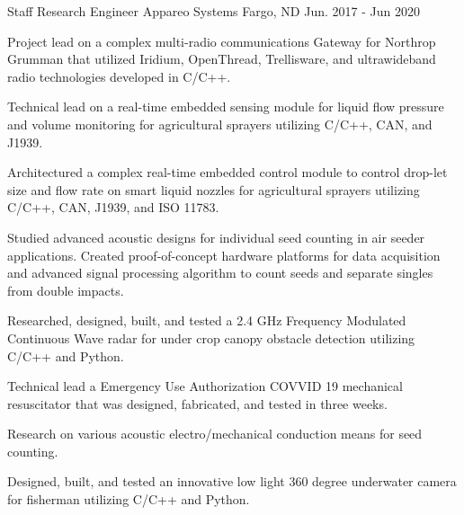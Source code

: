 \begin{cventries}
  \cventry
    {Staff Research Engineer} %
    {Appareo Systems} %
    {Fargo, ND} %
    {Jun. 2017 - Jun 2020} %
    {
      \begin{cvitems} %
        \item {Project lead on a complex multi-radio communications Gateway for Northrop Grumman that utilized Iridium, OpenThread, Trellisware, and ultrawideband radio technologies developed in C/C++.}
        \item {Technical lead on a real-time embedded sensing module for liquid flow pressure and volume monitoring for agricultural sprayers utilizing C/C++, CAN, and J1939.}
        \item {Architectured a complex real-time embedded control module to control drop-let size and flow rate on smart liquid nozzles for agricultural sprayers utilizing C/C++, CAN, J1939, and ISO 11783.}
        \item {Studied advanced acoustic designs for individual seed counting in air seeder applications. Created proof-of-concept hardware platforms for data acquisition and advanced signal processing algorithm to count seeds and separate singles from double impacts.}
        \item {Researched, designed, built, and tested a 2.4 GHz Frequency Modulated Continuous Wave radar for under crop canopy obstacle detection utilizing C/C++ and Python.}
        \item {Technical lead a Emergency Use Authorization COVVID 19 mechanical resuscitator that was designed, fabricated, and tested in three weeks.}
        \item {Research on various acoustic electro/mechanical conduction means for seed counting.}
        \item {Designed, built, and tested an innovative low light 360 degree underwater camera for fisherman utilizing C/C++ and Python.}
      \end{cvitems}
    }


\end{cventries}
